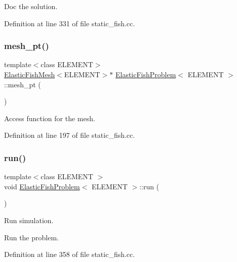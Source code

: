 Doc the solution. 



Definition at line 331 of file static\+\_\+fish.\+cc.

\mbox{\label{classElasticFishProblem_a616c07228c52c594f90dfb1333015712}} 
\subsubsection{\texorpdfstring{mesh\+\_\+pt()}{mesh\_pt()}}
{\footnotesize\ttfamily template$<$class E\+L\+E\+M\+E\+NT$>$ \\
\hyperlink{classElasticFishMesh}{Elastic\+Fish\+Mesh}$<$E\+L\+E\+M\+E\+NT$>$$\ast$ \hyperlink{classElasticFishProblem}{Elastic\+Fish\+Problem}$<$ E\+L\+E\+M\+E\+NT $>$\+::mesh\+\_\+pt (\begin{DoxyParamCaption}{ }\end{DoxyParamCaption})\hspace{0.3cm}{\ttfamily [inline]}}



Access function for the mesh. 



Definition at line 197 of file static\+\_\+fish.\+cc.

\mbox{\label{classElasticFishProblem_aaaf23036d8f282cff88e497ad214237f}} 
\subsubsection{\texorpdfstring{run()}{run()}}
{\footnotesize\ttfamily template$<$class E\+L\+E\+M\+E\+NT $>$ \\
void \hyperlink{classElasticFishProblem}{Elastic\+Fish\+Problem}$<$ E\+L\+E\+M\+E\+NT $>$\+::run (\begin{DoxyParamCaption}{ }\end{DoxyParamCaption})}



Run simulation. 

Run the problem. 

Definition at line 358 of file static\+\_\+fish.\+cc.



